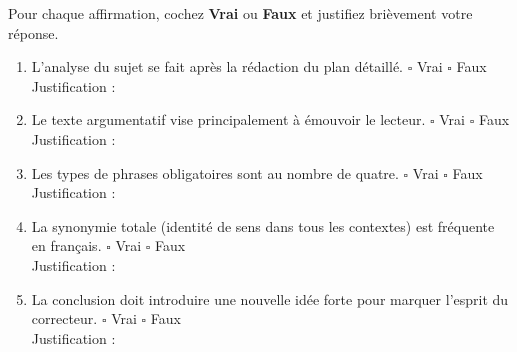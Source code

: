 \documentclass[11pt]{article}
\begin{document}
\begin{exercice}
\noindent Pour chaque affirmation, cochez \textbf{Vrai} ou \textbf{Faux} et justifiez brièvement votre réponse.
\begin{enumerate}
    \item L'analyse du sujet se fait après la rédaction du plan détaillé. \hfill $\square$ Vrai $\square$ Faux \\
    Justification : \dotfill
    \item Le texte argumentatif vise principalement à émouvoir le lecteur. \hfill $\square$ Vrai $\square$ Faux \\
    Justification : \dotfill
    \item Les types de phrases obligatoires sont au nombre de quatre. \hfill $\square$ Vrai $\square$ Faux \\
    Justification : \dotfill
    \item La synonymie totale (identité de sens dans tous les contextes) est fréquente en français. \hfill $\square$ Vrai $\square$ Faux \\
    Justification : \dotfill
    \item La conclusion doit introduire une nouvelle idée forte pour marquer l'esprit du correcteur. \hfill $\square$ Vrai $\square$ Faux \\
    Justification : \dotfill
\end{enumerate}
\end{exercice}
\end{document}
